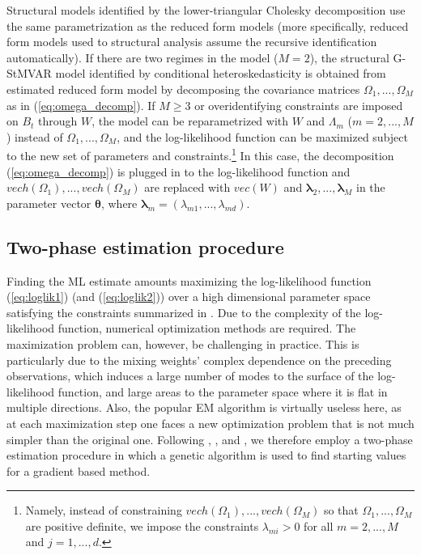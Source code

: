 \documentclass[nojss]{jss}
\begin{document}
Structural models identified by the lower-triangular Cholesky decomposition use the same parametrization as the reduced form models (more specifically, reduced form models used to structural analysis assume the recursive identification automatically). If there are two regimes in the model ($M=2$), the structural G-StMVAR model identified by conditional heteroskedasticity is obtained from estimated reduced form model by decomposing the covariance matrices $\Omega_1,...,\Omega_M$ as in (\ref{eq:omega_decomp}). If $M\geq 3$ or overidentifying constraints are imposed on $B_t$ through $W$,  the model can be reparametrized with $W$ and $\Lambda_m$ ($m=2,...,M$) instead of $\Omega_1,...,\Omega_M$,  and the log-likelihood function can be maximized subject to the new set of parameters and constraints.\footnote{Namely,  instead of constraining $vech(\Omega_1),...,vech(\Omega_M)$ so that $\Omega_1,...,\Omega_M$ are positive definite,  we impose the constraints $\lambda_{mi}>0$ for all $m=2,...,M$ and $j=1,...,d$.} In this case, the decomposition (\ref{eq:omega_decomp}) is plugged in to the log-likelihood function and $vech(\Omega_1),...,vech(\Omega_M)$ are replaced with $vec(W)$ and $\boldsymbol{\lambda}_2,...,\boldsymbol{\lambda}_M$ in the parameter vector $\boldsymbol{\theta}$,  where $\boldsymbol{\lambda}_m=(\lambda_{m1},...,\lambda_{md})$.


\subsection{Two-phase estimation procedure}\label{sec:estimscheme}

Finding the ML estimate amounts maximizing the log-likelihood function (\ref{eq:loglik1}) (and (\ref{eq:loglik2})) over a high dimensional parameter space satisfying the constraints summarized in \citet[Assumption 1]{Virolainen2:2021}.  Due to the complexity of the log-likelihood function, numerical optimization methods are required.  The maximization problem can, however, be challenging in practice.  This is particularly due to the mixing weights' complex dependence on the preceding observations,  which induces a large number of modes to the surface of the log-likelihood function, and large areas to the parameter space where it is flat in multiple directions.  Also, the popular EM algorithm \citep{Redner+Walker:1984} is virtually useless here,  as at each maximization step one faces a new optimization problem that is not much simpler than the original one.  Following \cite{Meitz+Preve+Saikkonen2:2018}, \cite{Meitz+Preve+Saikkonen:2021}, and \cite{Virolainen:2021, uGMAR}, we therefore employ a two-phase estimation procedure in which a genetic algorithm is used to find starting values for a gradient based method.
\end{document}
